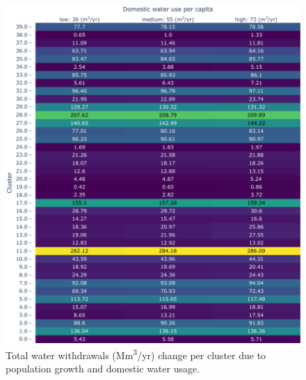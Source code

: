 \documentclass[12pt]{iopart}
\begin{document}
\newpage
\begin{figure}[!h]
	\centering
	\includegraphics[width=\textwidth]{PopSensitivityWaterCluster}
	\caption{Total water withdrawals (Mm\textsuperscript{3}/yr) change per cluster due to population growth and domestic water usage.}
	\label{fig:popasenswatercluster}
\end{figure}
\end{document}

